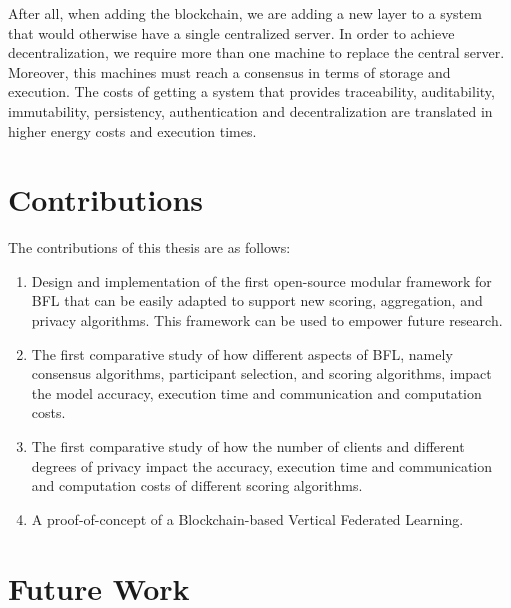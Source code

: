 After all, when adding the blockchain, we are adding a new layer to a system that would otherwise have a single centralized server. In order to achieve decentralization, we require more than one machine to replace the central server. Moreover, this machines must reach a consensus in terms of storage and execution. The costs of getting a system that provides traceability, auditability, immutability, persistency, authentication and decentralization are translated in higher energy costs and execution times.


\section{Contributions}\label{conclusions:contributions}

The contributions of this thesis are as follows:

\begin{enumerate}
    \item Design and implementation of the first open-source modular framework for BFL that can be easily adapted to support new scoring, aggregation, and privacy algorithms. This framework can be used to empower future research.
    
    \item The first comparative study of how different aspects of BFL, namely consensus algorithms, participant selection, and scoring algorithms, impact the model accuracy, execution time and communication and computation costs.
    
    \item The first comparative study of how the number of clients and different degrees of privacy impact the accuracy, execution time and communication and computation costs of different scoring algorithms.
    
    \item A proof-of-concept of a Blockchain-based Vertical Federated Learning.
\end{enumerate}

\section{Future Work}\label{conclusions:future_work}

